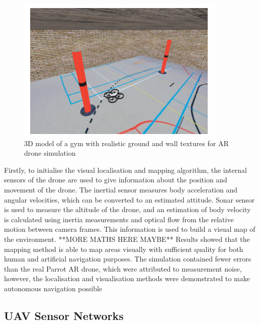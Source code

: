 \begin{figure}
\centering	
\includegraphics[scale=0.7]{img/dronemod}	
\caption{3D model of a gym with realistic ground and wall textures for AR drone simulation}
\end{figure}

Firstly, to initialise the visual localisation and mapping algorithm, the internal sensors of the drone are used to give information about the position and movement of the drone. The inertial sensor measures body acceleration and angular velocities, which can be converted to an estimated attitude. Sonar sensor is used to measure the altitude of the drone, and an estimation of body velocity is calculated using inertia measurements and optical flow from the relative motion between camera frames. This information is used to build a visual map of the environment.
**MORE MATHS HERE MAYBE**
Results showed that the mapping method is able to map areas visually with sufficient quality for both human and artificial navigation purposes. The simulation contained fewer errors than the real Parrot AR drone, which were attributed to measurement noise, however, the localisation and visualisation methods were demonstrated to make autonomous navigation possible

\subsection{UAV Sensor Networks}

